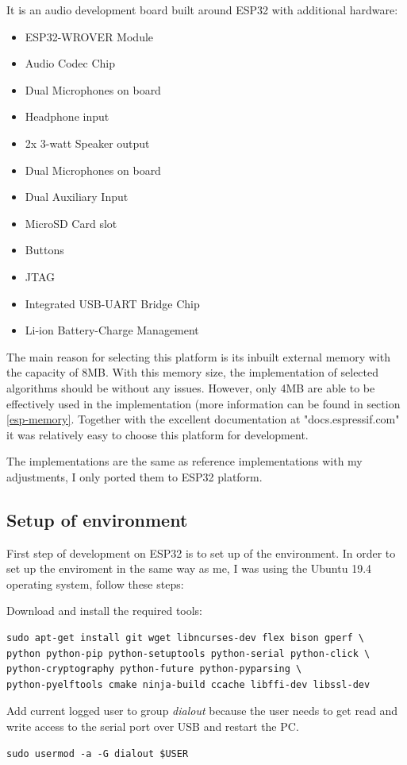 \documentclass[thesis=M,english]{FITthesis}[2019/12/23]
\begin{document}
It is an audio development board built around ESP32 with additional hardware:
\begin{itemize}
\item	ESP32-WROVER Module
\item	Audio Codec Chip
\item	Dual Microphones on board
\item	Headphone input
\item	2x 3-watt Speaker output
\item	Dual Microphones on board
\item	Dual Auxiliary Input
\item	MicroSD Card slot
\item	Buttons
\item	JTAG
\item	Integrated USB-UART Bridge Chip
\item	Li-ion Battery-Charge Management
\end{itemize}
The main reason for selecting this platform is its inbuilt external memory with the capacity of 8MB. With this memory size, the implementation of selected algorithms should be without any issues. However, only 4MB are able to be effectively used in the implementation (more information can be found in section \ref{esp-memory}. Together with the excellent documentation at "docs.espressif.com" it was relatively easy to choose this platform for development.

\bigskip
\noindent
The implementations are the same as reference implementations with my adjustments, I only ported them to ESP32 platform.

\subsection{Setup of environment}
First step of development on ESP32 is to set up of the environment. In order to set up the enviroment in the same way as me, I was using the Ubuntu 19.4 operating system, follow these steps:

\bigskip
\noindent
Download and install the required tools:
\begin{lstlisting}[frame=single]
sudo apt-get install git wget libncurses-dev flex bison gperf \
python python-pip python-setuptools python-serial python-click \
python-cryptography python-future python-pyparsing \
python-pyelftools cmake ninja-build ccache libffi-dev libssl-dev
\end{lstlisting}

\bigskip
\noindent
Add current logged user to group \textit{dialout} because the user needs to get read and write access to the serial port over USB and restart the PC.
\begin{lstlisting}[frame=single]
sudo usermod -a -G dialout $USER
\end{lstlisting}
\end{document}
